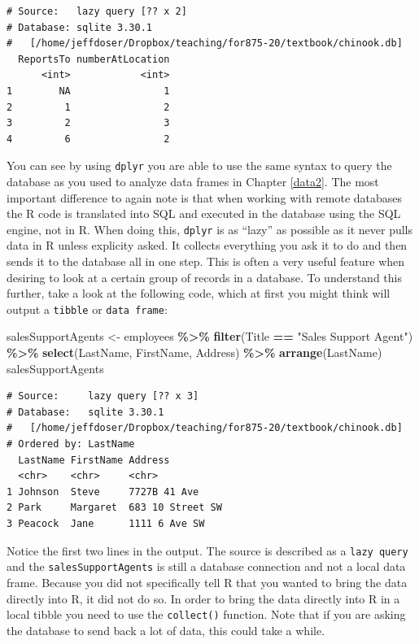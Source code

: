 \documentclass[
]{krantz}
\makeatletter
\newenvironment{Shaded}{\begin{snugshade}}{\end{snugshade}}
\newcommand{\KeywordTok}[1]{\textcolor[rgb]{0.27,0.27,0.27}{\textbf{#1}}}
\newcommand{\NormalTok}[1]{#1}
\newcommand{\OperatorTok}[1]{\textcolor[rgb]{0.43,0.43,0.43}{\textbf{#1}}}
\newcommand{\StringTok}[1]{\textcolor[rgb]{0.5,0.5,0.5}{#1}}
\newenvironment{kframe}{%
\medskip{}
\setlength{\fboxsep}{.8em}
 \def\at@end@of@kframe{}%
 \ifinner\ifhmode%
  \def\at@end@of@kframe{\end{minipage}}%
  \begin{minipage}{\columnwidth}%
 \fi\fi%
 \def\FrameCommand##1{\hskip\@totalleftmargin \hskip-\fboxsep
 \colorbox{shadecolor}{##1}\hskip-\fboxsep
     \hskip-\linewidth \hskip-\@totalleftmargin \hskip\columnwidth}%
 \MakeFramed {\advance\hsize-\width
   \@totalleftmargin\z@ \linewidth\hsize
   \@setminipage}}%
 {\par\unskip\endMakeFramed%
 \at@end@of@kframe}
\renewenvironment{Shaded}{\begin{kframe}}{\end{kframe}}
\makeatother
\begin{document}
\begin{verbatim}
# Source:   lazy query [?? x 2]
# Database: sqlite 3.30.1
#   [/home/jeffdoser/Dropbox/teaching/for875-20/textbook/chinook.db]
  ReportsTo numberAtLocation
      <int>            <int>
1        NA                1
2         1                2
3         2                3
4         6                2
\end{verbatim}

You can see by using \texttt{dplyr} you are able to use the same syntax to query the database as you used to analyze data frames in Chapter \ref{data2}. The most important difference to again note is that when working with remote databases the R code is translated into SQL and executed in the database using the SQL engine, not in R. When doing this, \texttt{dplyr} is as ``lazy'' as possible as it never pulls data in R unless explicity asked. It collects everything you ask it to do and then sends it to the database all in one step. This is often a very useful feature when desiring to look at a certain group of records in a database. To understand this further, take a look at the following code, which at first you might think will output a \texttt{tibble} or \texttt{data\ frame}:

\begin{Shaded}
\begin{Highlighting}[]
\NormalTok{salesSupportAgents \textless{}{-}}\StringTok{ }\NormalTok{employees }\OperatorTok{\%\textgreater{}\%}\StringTok{ }
\StringTok{  }\KeywordTok{filter}\NormalTok{(Title }\OperatorTok{==}\StringTok{ "Sales Support Agent"}\NormalTok{) }\OperatorTok{\%\textgreater{}\%}\StringTok{ }
\StringTok{  }\KeywordTok{select}\NormalTok{(LastName, FirstName, Address) }\OperatorTok{\%\textgreater{}\%}\StringTok{ }
\StringTok{  }\KeywordTok{arrange}\NormalTok{(LastName) }
\NormalTok{salesSupportAgents}
\end{Highlighting}
\end{Shaded}

\begin{verbatim}
# Source:     lazy query [?? x 3]
# Database:   sqlite 3.30.1
#   [/home/jeffdoser/Dropbox/teaching/for875-20/textbook/chinook.db]
# Ordered by: LastName
  LastName FirstName Address         
  <chr>    <chr>     <chr>           
1 Johnson  Steve     7727B 41 Ave    
2 Park     Margaret  683 10 Street SW
3 Peacock  Jane      1111 6 Ave SW   
\end{verbatim}

Notice the first two lines in the output. The source is described as a \texttt{lazy\ query} and the \texttt{salesSupportAgents} is still a database connection and not a local data frame. Because you did not specifically tell R that you wanted to bring the data directly into R, it did not do so. In order to bring the data directly into R in a local tibble you need to use the \texttt{collect()} function. Note that if you are asking the database to send back a lot of data, this could take a while.
\end{document}
